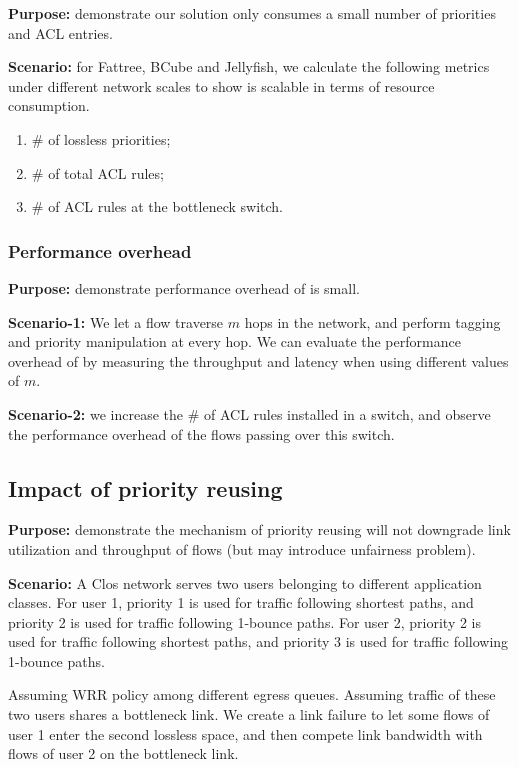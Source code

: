 \textbf{Purpose:} demonstrate our solution only consumes a small number of priorities and ACL entries.

\textbf{Scenario:} for Fattree, BCube and Jellyfish, we calculate the following metrics under different network scales to show \sysname{} is scalable in terms of resource consumption.
\begin{enumerate}
	\item $\#$ of lossless priorities;
	\item $\#$ of total ACL rules;
 	\item $\#$ of ACL rules at the bottleneck switch.
\end{enumerate}

\subsubsection{Performance overhead}\label{subsec:exp_performanceoverhead}

 \textbf{Purpose:} demonstrate performance overhead of \sysname{} is small.

\textbf{Scenario-1:} We let a flow traverse $m$ hops in the network, and perform tagging and priority manipulation at every hop. We can evaluate the performance overhead of \sysname{} by measuring the throughput and latency when using different values of $m$.

\textbf{Scenario-2:} we increase the $\#$ of ACL rules installed in a switch, and observe the performance overhead of the flows passing over this switch.

\subsection{Impact of priority reusing}\label{subsec:exp_priorityreusing}

\textbf{Purpose:} demonstrate the mechanism of priority reusing will not downgrade link utilization and throughput of flows (but may introduce unfairness problem).

\textbf{Scenario:} A Clos network serves two users belonging to different application classes. For user 1, priority 1 is used for traffic following shortest paths, and priority 2 is used for traffic following 1-bounce paths. For user 2, priority 2 is used for traffic following shortest paths, and priority 3 is used for traffic following 1-bounce paths.

Assuming WRR policy among different egress queues. Assuming traffic of these two users shares a bottleneck link. We create a link failure to let some flows of user 1 enter the second lossless space, and then compete link bandwidth with flows of user 2 on the bottleneck link. 

